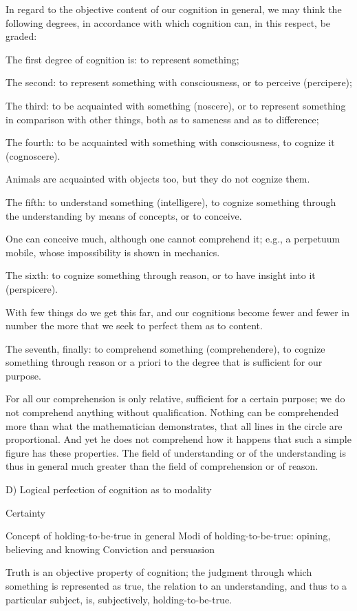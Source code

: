 In regard to the objective content of our cognition in general,
we may think the following degrees, in accordance with which
cognition can, in this respect, be graded:

The first degree of cognition is: to represent something;

The second: to represent something with consciousness,
or to perceive (percipere);

The third: to be acquainted with something (noscere), or
to represent something in comparison with other things,
both as to sameness and as to difference;

The fourth: to be acquainted with something with consciousness,
to cognize it (cognoscere).

Animals are acquainted with objects too,
but they do not cognize them.

The fifth: to understand something (intelligere),
to cognize something through the understanding
by means of concepts,
or to conceive.

One can conceive much, although one cannot comprehend it;
e.g., a perpetuum mobile, whose impossibility is shown in mechanics.

The sixth: to cognize something through reason, or
to have insight into it (perspicere).

With few things do we get this far,
and our cognitions become fewer and fewer in number
the more that we seek to perfect them as to content.

The seventh, finally: to comprehend something (comprehendere),
to cognize something through reason or a priori
to the degree that is sufficient for our purpose.

For all our comprehension is only relative,
sufficient for a certain purpose;
we do not comprehend anything without qualification.
Nothing can be comprehended more than
what the mathematician demonstrates,
that all lines in the circle are proportional.
And yet he does not comprehend how it happens
that such a simple figure has these properties.
The field of understanding or of the understanding is
thus in general much greater than
the field of comprehension or of reason.

D) Logical perfection of cognition as to modality

Certainty

    Concept of holding-to-be-true in general
    Modi of holding-to-be-true: opining, believing and knowing
    Conviction and persuasion

Truth is an objective property of cognition;
the judgment through which something is represented as true,
the relation to an understanding, and thus to a particular subject, is,
subjectively, holding-to-be-true.

